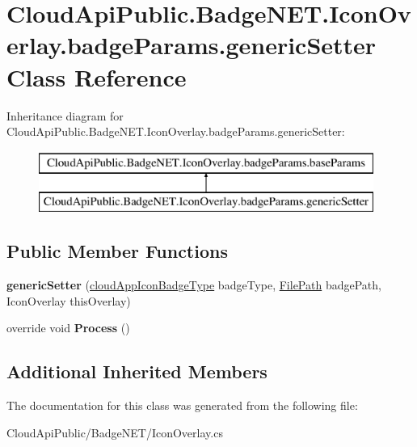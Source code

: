 \hypertarget{class_cloud_api_public_1_1_badge_n_e_t_1_1_icon_overlay_1_1badge_params_1_1generic_setter}{\section{Cloud\-Api\-Public.\-Badge\-N\-E\-T.\-Icon\-Overlay.\-badge\-Params.\-generic\-Setter Class Reference}
\label{class_cloud_api_public_1_1_badge_n_e_t_1_1_icon_overlay_1_1badge_params_1_1generic_setter}
}
Inheritance diagram for Cloud\-Api\-Public.\-Badge\-N\-E\-T.\-Icon\-Overlay.\-badge\-Params.\-generic\-Setter\-:\begin{figure}[H]
\begin{center}
\leavevmode
\includegraphics[height=2.000000cm]{class_cloud_api_public_1_1_badge_n_e_t_1_1_icon_overlay_1_1badge_params_1_1generic_setter}
\end{center}
\end{figure}
\subsection*{Public Member Functions}
\begin{DoxyCompactItemize}
\item 
\hypertarget{class_cloud_api_public_1_1_badge_n_e_t_1_1_icon_overlay_1_1badge_params_1_1generic_setter_a358847062f58dd892194869e0f9d8f56}{{\bfseries generic\-Setter} (\hyperlink{namespace_cloud_api_public_1_1_badge_n_e_t_afab91a750338fef6bd4ef08f5381c4e4}{cloud\-App\-Icon\-Badge\-Type} badge\-Type, \hyperlink{class_cloud_api_public_1_1_model_1_1_file_path}{File\-Path} badge\-Path, Icon\-Overlay this\-Overlay)}\label{class_cloud_api_public_1_1_badge_n_e_t_1_1_icon_overlay_1_1badge_params_1_1generic_setter_a358847062f58dd892194869e0f9d8f56}

\item 
\hypertarget{class_cloud_api_public_1_1_badge_n_e_t_1_1_icon_overlay_1_1badge_params_1_1generic_setter_a119f96b8cfc81af0fb79d76b11447276}{override void {\bfseries Process} ()}\label{class_cloud_api_public_1_1_badge_n_e_t_1_1_icon_overlay_1_1badge_params_1_1generic_setter_a119f96b8cfc81af0fb79d76b11447276}

\end{DoxyCompactItemize}
\subsection*{Additional Inherited Members}


The documentation for this class was generated from the following file\-:\begin{DoxyCompactItemize}
\item 
Cloud\-Api\-Public/\-Badge\-N\-E\-T/Icon\-Overlay.\-cs\end{DoxyCompactItemize}

